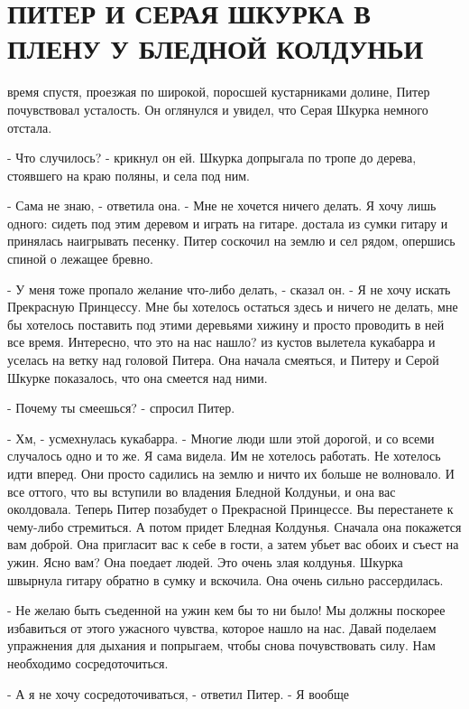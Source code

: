 \chapter{ПИТЕР И СЕРАЯ ШКУРКА В ПЛЕНУ У БЛЕДНОЙ КОЛДУНЬИ}
\par{} время спустя, проезжая по широкой, поросшей кустарниками 
долине, Питер почувствовал усталость. Он оглянулся и увидел, что Серая 
Шкурка немного отстала.
\par- Что случилось? - крикнул он ей.
 Шкурка допрыгала по тропе до дерева, стоявшего на краю 
поляны, и села под ним.
\par- Сама не знаю, - ответила она. - Мне не хочется ничего делать. Я 
хочу лишь одного: сидеть под этим деревом и играть на гитаре.
 достала из сумки гитару и принялась наигрывать песенку. Питер 
соскочил на землю и сел рядом, опершись спиной о лежащее бревно.
\par- У меня тоже пропало желание что-либо делать, - сказал он. - Я не 
хочу искать Прекрасную Принцессу. Мне бы хотелось остаться здесь и 
ничего не делать, мне бы хотелось поставить под этими деревьями хижину 
и просто проводить в ней все время. Интересно, что это на нас нашло?
 из кустов вылетела кукабарра и уселась на ветку над головой 
Питера. Она начала смеяться, и Питеру и Серой Шкурке показалось, что 
она смеется над ними.
\par- Почему ты смеешься? - спросил Питер.
\par- Хм, - усмехнулась кукабарра. - Многие люди шли этой дорогой, и 
со всеми случалось одно и то же. Я сама видела. Им не хотелось 
работать. Не хотелось идти вперед. Они просто садились на землю и 
ничто их больше не волновало. И все оттого, что вы вступили во 
владения Бледной Колдуньи, и она вас околдовала. Теперь Питер 
позабудет о Прекрасной Принцессе. Вы перестанете к чему-либо 
стремиться. А потом придет Бледная Колдунья. Сначала она покажется вам 
доброй. Она пригласит вас к себе в гости, а затем убьет вас обоих и 
съест на ужин. Ясно вам? Она поедает людей. Это очень злая колдунья.
 Шкурка швырнула гитару обратно в сумку и вскочила. Она очень 
сильно рассердилась.
\par- Не желаю быть съеденной на ужин кем бы то ни было! Мы должны 
поскорее избавиться от этого ужасного чувства, которое нашло на нас. 
Давай поделаем упражнения для дыхания и попрыгаем, чтобы снова 
почувствовать силу. Нам необходимо сосредоточиться.
\par- А я не хочу сосредоточиваться, - ответил Питер. - Я вообще 
